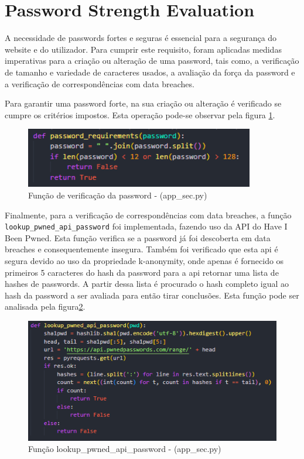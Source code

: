 \section{Password Strength Evaluation}

A necessidade de passwords fortes e seguras é essencial para a segurança do website e do utilizador.
Para cumprir este requisito, foram aplicadas medidas imperativas para a criação ou alteração de uma password, tais como, a verificação de tamanho e variedade de caracteres usados, a avaliação da força da password e a verificação de correspondências com data breaches. 

Para garantir uma password forte, na sua criação ou alteração é verificado se cumpre os critérios impostos. Esta operação pode-se observar pela figura \ref{fig:2_1_1e2-feature}.
\begin{figure}[H]
      \centering
      \includegraphics[width=10cm]{images/2_1_1e2.png}
      \caption{Função de verificação da password  - (app\_sec.py)}
      \label{fig:2_1_1e2-feature}
\end{figure}

Finalmente, para a verificação de correspondências com data breaches, a função \texttt{lookup\_pwned\_api\_password} foi implementada, fazendo uso da API do Have I Been Pwned. Esta função verifica se a password já foi descoberta em data breaches e consequentemente insegura.
Também foi verificado que esta api é segura devido ao uso da propriedade k-anonymity, onde apenas é fornecido os primeiros 5 caracteres do hash da password para a api retornar uma lista de hashes de passwords. A partir dessa lista é procurado o hash completo igual ao hash da password a ser avaliada para então tirar conclusões. Esta função pode ser analisada pela figura\ref{fig:lookup_pwned_api_password-feature}.
\begin{figure}[H]
      \centering
      \includegraphics[width=14cm]{images/lookup_pwned_api_password.png}
      \caption{Função lookup\_pwned\_api\_password  - (app\_sec.py)}
      \label{fig:lookup_pwned_api_password-feature}
\end{figure}

